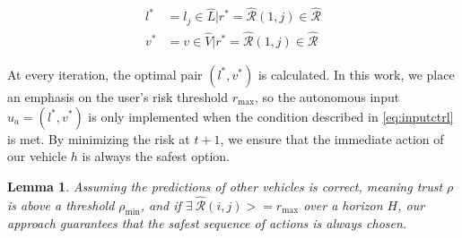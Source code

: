 \documentclass[letterpaper, 10 pt, conference]{ieeeconf}  %
\newtheorem{lemma}{Lemma}
\newcommand\NB[1]{$\spadesuit$\footnote{NB: #1}}
\begin{document}
\begin{align} \label{eq:optpair}
    l^* &=  l_j\in\hat{L}\vert r^* = \hat{\mathcal{R}}(1,j)\in\hat{\mathcal{R}} \nonumber \\
    v^* &=  v\in\hat{V}\vert r^* = \hat{\mathcal{R}}(1,j)\in\hat{\mathcal{R}}
\end{align}


At every iteration, the optimal pair $(l^*,v^*)$ is calculated. In this work, we place an emphasis on the user's risk threshold $r_\max$, so the autonomous input $u_a = (l^*,v^*)$ is only implemented when the condition described in \eqref{eq:inputctrl} is met. By minimizing the risk at $t+1$, we ensure that the immediate action of our vehicle $h$ is always the safest option.

\begin{lemma}
Assuming the predictions of other vehicles is correct, meaning trust $\rho$ is above a threshold $\rho_\min$, and if $\exists~\hat{\mathcal{R}}(i,j) >= r_\max$ over a horizon $H$, our approach guarantees that the safest sequence of actions is always chosen.
\end{lemma}
\end{document}
